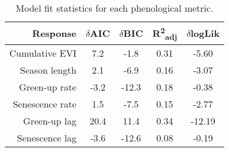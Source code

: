 \begin{table}[H]
\centering
\begin{tabular}{rcccc}
  \hline
Response & $\delta$AIC & $\delta$BIC & R\textsuperscript{2}\textsubscript{adj} & $\delta$logLik \\ 
  \hline
Cumulative EVI & 7.2 & -1.8 & 0.31 & -5.60 \\ 
  Season length & 2.1 & -6.9 & 0.16 & -3.07 \\ 
  Green-up rate & -3.2 & -12.3 & 0.18 & -0.38 \\ 
  Senescence rate & 1.5 & -7.5 & 0.15 & -2.77 \\ 
  Green-up lag & 20.4 & 11.4 & 0.34 & -12.19 \\ 
  Senescence lag & -3.6 & -12.6 & 0.08 & -0.19 \\ 
   \hline
\end{tabular}
\caption{Model fit statistics for each phenological metric.} 
\label{mod_stat}
\end{table}


